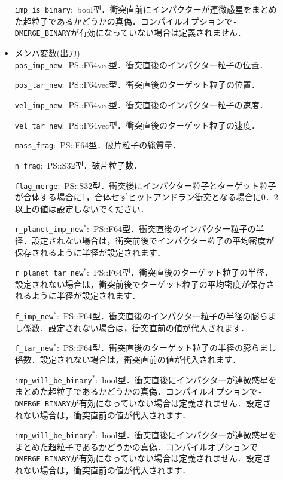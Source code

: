 \documentclass[12pt,a4paper,dvipdfmx]{jsarticle}
\begin{document}
\begin{description}
\begin{itemize}
\texttt{imp\_is\_binary}:\ bool型．衝突直前にインパクターが連微惑星をまとめた超粒子であるかどうかの真偽．コンパイルオプションで\texttt{-DMERGE\_BINARY}が有効になっていない場合は定義されません．
\\

\item
メンバ変数(出力)\\
\texttt{pos\_imp\_new}:\ PS::F64vec型．衝突直後のインパクター粒子の位置．

\texttt{pos\_tar\_new}:\ PS::F64vec型．衝突直後のターゲット粒子の位置．

\texttt{vel\_imp\_new}:\ PS::F64vec型．衝突直後のインパクター粒子の速度．

\texttt{vel\_tar\_new}:\ PS::F64vec型．衝突直後のターゲット粒子の速度．

\texttt{mass\_frag}:\ PS::F64型．破片粒子の総質量．

\texttt{n\_frag}:\ PS::S32型．破片粒子数．

\texttt{flag\_merge}:\ PS::S32型．衝突後にインパクター粒子とターゲット粒子が合体する場合に1，合体せずヒットアンドラン衝突となる場合に0．2以上の値は設定しないでください．

\texttt{r\_planet\_imp\_new}${}^{*}$:\ PS::F64型．衝突直後のインパクター粒子の半径．設定されない場合は，衝突前後でインパクター粒子の平均密度が保存されるように半径が設定されます．

\texttt{r\_planet\_tar\_new}${}^{*}$:\ PS::F64型．衝突直後のターゲット粒子の半径．設定されない場合は，衝突前後でターゲット粒子の平均密度が保存されるように半径が設定されます．

\texttt{f\_imp\_new}${}^{*}$:\ PS::F64型．衝突直後のインパクター粒子の半径の膨らまし係数．設定されない場合は，衝突直前の値が代入されます．

\texttt{f\_tar\_new}${}^{*}$:\ PS::F64型．衝突直後のターゲット粒子の半径の膨らまし係数．設定されない場合は，衝突直前の値が代入されます．

\texttt{imp\_will\_be\_binary}${}^{*}$:\ bool型．衝突直後にインパクターが連微惑星をまとめた超粒子であるかどうかの真偽．コンパイルオプションで\texttt{-DMERGE\_BINARY}が有効になっていない場合は定義されません．設定されない場合は，衝突直前の値が代入されます．

\texttt{imp\_will\_be\_binary}${}^{*}$:\ bool型．衝突直後にインパクターが連微惑星をまとめた超粒子であるかどうかの真偽．コンパイルオプションで\texttt{-DMERGE\_BINARY}が有効になっていない場合は定義されません．設定されない場合は，衝突直前の値が代入されます．
\\


\end{itemize}
\end{description}
\end{document}
